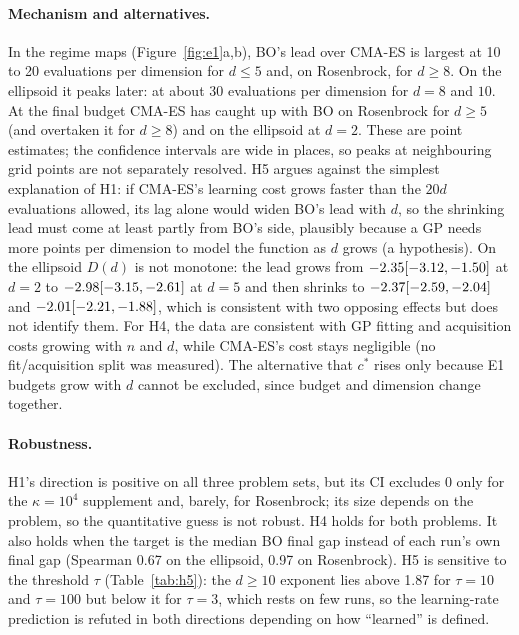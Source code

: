 \documentclass[10pt,a4paper,twocolumn]{article}
\begin{document}
\paragraph{Mechanism and alternatives.}
In the regime maps (Figure~\ref{fig:e1}a,b), BO's lead over CMA-ES is largest at 10 to 20 evaluations per dimension
for $d\leq 5$ and, on Rosenbrock, for $d\geq 8$. On the ellipsoid it peaks later: at about 30 evaluations per dimension
for $d=8$ and $10$.
At the final budget CMA-ES has caught up with BO on Rosenbrock for $d\geq 5$ (and overtaken it for $d\geq 8$)
and on the ellipsoid at $d=2$. These are point estimates; the confidence intervals are wide in places, so peaks at neighbouring grid points are not separately resolved.
H5 argues against the simplest explanation of H1:
if CMA-ES's learning cost grows faster than the $20d$ evaluations allowed, its lag alone would widen BO's lead with $d$,
so the shrinking lead must come at least partly from BO's side, plausibly because a GP needs more points per dimension to
model the function as $d$ grows (a hypothesis). On the ellipsoid $D(d)$ is not monotone: the lead grows from
$-2.35 [-3.12, -1.50]$ at $d=2$ to $-2.98 [-3.15, -2.61]$ at $d=5$ and then shrinks to $-2.37 [-2.59, -2.04]$ and
$-2.01 [-2.21, -1.88]$, which is consistent with two opposing effects but does not identify them. For H4, the data are consistent with
GP fitting and acquisition costs growing with $n$ and $d$, while CMA-ES's cost stays negligible (no fit/acquisition split was measured). The
alternative that $c^*$ rises only because E1 budgets grow with $d$ cannot be excluded, since budget and dimension change
together.

\paragraph{Robustness.}
H1's direction is positive on all three problem sets, but its CI excludes 0 only for the $\kappa=10^4$ supplement and, barely, for Rosenbrock;
its size depends on the problem, so the quantitative guess is not robust. H4 holds for both problems.
It also holds when the target is the median BO final gap instead of each run's own final gap (Spearman 0.67 on the ellipsoid, 0.97 on Rosenbrock).
H5 is sensitive to the threshold
$\tau$ (Table~\ref{tab:h5}): the $d\geq10$ exponent lies above 1.87 for $\tau=10$ and $\tau=100$ but below it for
$\tau=3$, which rests on few runs, so the learning-rate prediction is refuted in both directions depending on how
``learned'' is defined.
\end{document}
